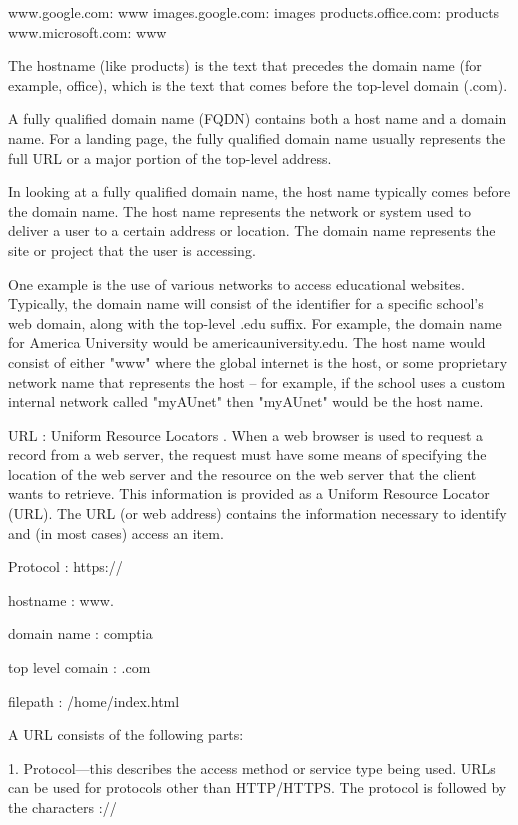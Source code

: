     www.google.com: www
    images.google.com: images
    products.office.com: products
    www.microsoft.com: www

The hostname (like products) is the text that precedes the domain name (for
example, office), which is the text that comes before the top-level domain
(.com).

A fully qualified domain name (FQDN) contains both a host name and a domain name. For a landing page, the fully qualified domain name usually represents the full URL or a major portion of the top-level address.

In looking at a fully qualified domain name, the host name typically comes before the domain name. The host name represents the network or system used to deliver a user to a certain address or location. The domain name represents the site or project that the user is accessing.

One example is the use of various networks to access educational websites. Typically, the domain name will consist of the identifier for a specific school’s web domain, along with the top-level .edu suffix. For example, the domain name for America University would be americauniversity.edu. The host name would consist of either "www" where the global internet is the host, or some proprietary network name that represents the host – for example, if the school uses a custom internal network called "myAUnet" then "myAUnet" would be the host name.



URL : Uniform Resource Locators . When a web browser is used to request a record
from a web server, the request must have some means of specifying the location
of the web server and the resource on the web server that the client wants to
retrieve. This information is provided as a Uniform Resource Locator (URL).  The
URL (or web address) contains the information necessary to identify and (in most
cases) access an item. 

Protocol : 
https://

hostname : www.

domain name : comptia

top level comain : .com

filepath : /home/index.html

A URL consists of the following parts:

1. Protocol—this describes the access method or service type being used. URLs
can be used for protocols other than HTTP/HTTPS. The protocol is followed by the
characters ://

